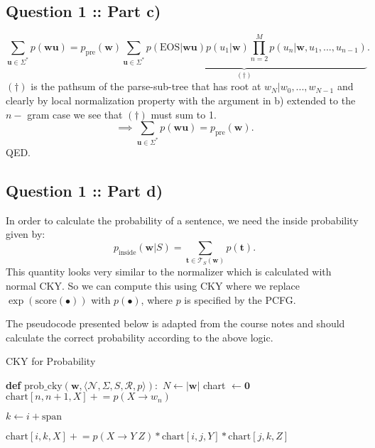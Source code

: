 \documentclass[a4paper]{article}
\begin{document}
\subsection*{Question 1 :: Part c)}
\[
    \sum_{\bm{u} \in \Sigma^*} p(\bm{w}\bm{u}) = p_{\text{pre}}(\bm{w}) \underbrace{\sum_{\bm{u} \in \Sigma^*} p(\text{EOS} | \bm{w}\bm{u}) p(u_1 | \bm{w}) \prod_{n=2}^{M} p(u_n | \bm{w}, u_1, ..., u_{n-1}) }_{(\dag)}
.\]
$(\dag)$ is the pathsum of the parse-sub-tree that has root at $w_N | w_0, ..., w_{N-1}$ and clearly
by local normalization property with the argument in b) extended to the $n-$ gram case we see that 
$(\dag)$ must sum to 1.
\[
  \implies  \sum_{\bm{u}\in \Sigma^*} p(\bm{w}\bm{u}) = p_{\text{pre}}(\bm{w})
.\]
QED.

\subsection*{Question 1 :: Part d)}

In order to calculate the probability of a sentence, we need
the inside probability given by:
\[
p_{\text{inside}}(\bm{w} | S) = \sum_{\bm{t} \in \mathcal{T}_S(\bm{w})} p(\bm{t})
.\]
This quantity looks very similar to the normalizer which is calculated
with normal CKY. So we can compute this using CKY where we replace $\exp(\text{score}(\bullet))$ with $p(\bullet)$,
where $p$ is specified by the PCFG.

The pseudocode presented below is adapted from the course notes and should
calculate the correct probability according to the above logic.

\clearpage

\begin{algorithm}
\caption{CKY for Probability}
\begin{algorithmic}
\State  \textbf{def} $\mathrm{prob\_cky} (\bm{w}, \langle \mathcal{N}, \Sigma, S, \mathcal{R}, p \rangle):$
\State $N \gets \left| \bm{w} \right| $
\State chart $\gets \bm{0}$
 
        \State $\text{chart}[n, n+1, X] \mathrel{+}= p(X\to w_n)$
    \EndFor
\EndFor

 
     
        \State $k \gets i + \text{span}$  
          

            \State $\text{chart}[i, k, X] \mathrel{+}= p(X\to Y~Z) * \text{chart}[i, j, Y] * \text{chart}[j, k, Z]$

            \EndFor
        \EndFor
    \EndFor
\EndFor
\State {}
\end{algorithmic}
\end{algorithm}
\end{document}
